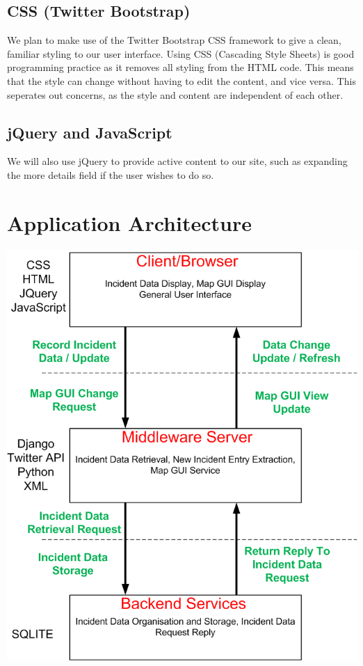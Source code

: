 \documentclass{sig-alt-release2}
\begin{document}
\subsection{CSS (Twitter Bootstrap)}
We plan to make use of the Twitter Bootstrap CSS framework to give a clean, familiar styling to our user interface. Using CSS (Cascading Style Sheets) is good programming practice as it removes all styling from the HTML code. This means that the style can change without having to edit the content, and vice versa. This seperates out concerns, as the style and content are independent of each other.

\subsection{jQuery and JavaScript}
We will also use jQuery to provide active content to our site, such as expanding the more details field if the user wishes to do so.

\newpage
\section{Application Architecture}

\begin{center}
\includegraphics[scale=0.3]{img/2.png}
\end{center}
\end{document}
